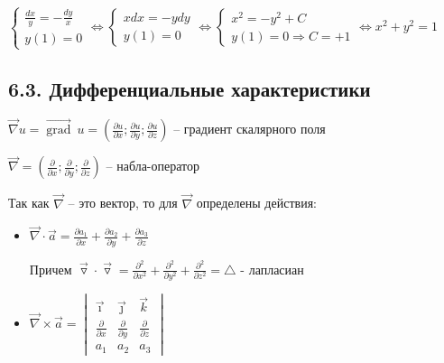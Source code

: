 \documentclass[12pt]{article}
\begin{document}
    $\begin{cases}
        \frac{dx}{y} = -\frac{dy}{x} \\ y(1) = 0
    \end{cases} \Longleftrightarrow \begin{cases}
        xdx = -ydy \\ y(1) = 0
    \end{cases} \Longleftrightarrow \begin{cases}
        x^2 = -y^2 + C \\ y(1) = 0 \Longrightarrow C = +1
    \end{cases} \Longleftrightarrow x^2 + y^2 = 1 $

    \hypertarget{differentialcharacteristics}{}

    \subsection{6.3. Дифференциальные характеристики}

    \Mems $\vec\nabla u = \overrightarrow{\operatorname{grad}} \ u = \left(\frac{\partial u}{\partial x}; \frac{\partial u}{\partial y}; \frac{\partial u}{\partial z}\right)$ -- градиент скалярного поля

    $\vec\nabla = \left(\frac{\partial}{\partial x}; \frac{\partial}{\partial y}; \frac{\partial}{\partial z}\right)$ -- набла-оператор

    \Nota Так как $\vec\nabla$ -- это вектор, то для $\vec\nabla$ определены действия:

    \begin{itemize}
        \item $\vec\nabla \cdot \vec{a} = \frac{\partial a_1}{\partial x} + \frac{\partial a_2}{\partial y} + \frac{\partial a_3}{\partial z}$

    Причем $\overrightarrow{\triangledown} \cdot \overrightarrow{\triangledown} = \frac{\partial^2}{\partial x^2} + \frac{\partial^2}{\partial y^2} + \frac{\partial^2}{\partial z^2} = \triangle$ - лапласиан
        \item $\vec\nabla \times \vec{a} =
        \begin{vmatrix}
            \vec\imath & \vec\jmath & \vec k \\
            \frac{\partial}{\partial x} & \frac{\partial}{\partial y} & \frac{\partial}{\partial z} \\
            a_1 & a_2 & a_3
        \end{vmatrix}$
    \end{itemize}
\end{document}

